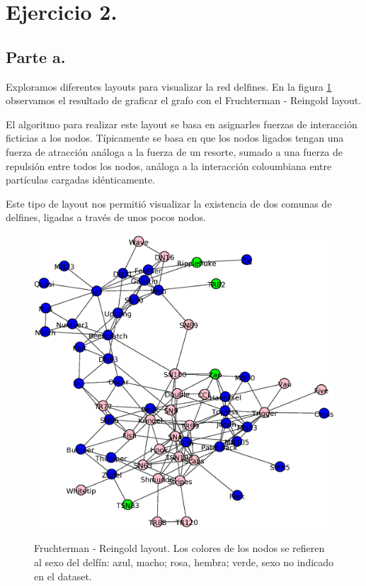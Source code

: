 
\section{Ejercicio 2.}

\subsection{Parte a.}

\par Exploramos diferentes layouts para visualizar la red delfines.
En la figura \ref{fig:Layout_delfines} observamos el resultado de graficar
el grafo con el Fruchterman - Reingold layout. 
\par El algoritmo para realizar este layout se basa en asignarles fuerzas de interacción ficticias a los nodos. Típicamente se basa en que los nodos ligados tengan una fuerza de atracción análoga a la fuerza de un resorte, sumado a una fuerza de repulsión entre todos los nodos, análoga a la interacción coloumbiana entre partículas cargadas idénticamente.
\par Este tipo de layout nos permitió visualizar la existencia de dos comunas de delfines, ligadas a través de unos pocos nodos.

\begin{figure}[h]
\centering
\includegraphics[scale = 0.50]{figuras/FrutRein}
\label{fig:Layout_delfines}
\caption{Fruchterman - Reingold layout. Los colores de los nodos se refieren al sexo del delfín: azul, macho; rosa, hembra; verde, sexo no indicado en el dataset.}
\end{figure}
